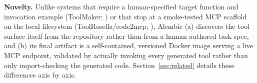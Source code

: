 \textbf{Novelty.} Unlike systems that require a human-specified target function and invocation example (ToolMaker; \citealp{toolmaker2025}) or that stop at a smoke-tested MCP scaffold on the local filesystem (ToolRosella/code2mcp; \citealp{toolrosella2026}), Alembic (a) discovers the tool surface itself from the repository rather than from a human-authored task spec, and (b) its final artifact is a self-contained, versioned Docker image serving a live MCP endpoint, validated by actually invoking every generated tool rather than only import-checking the generated code. Section~\ref{sec:related} details these differences axis by axis.
